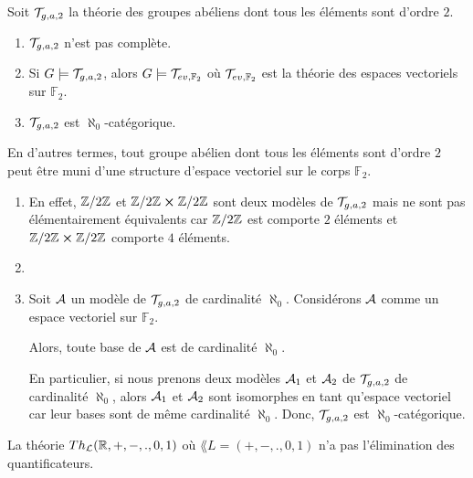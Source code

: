 \documentclass[a4paper, 12pt]{report}
\begin{document}
\begin{exercice}
	\label{exercice:groupe_abelien_elem_ordre_2_pas_complete}
	Soit $\mathcal{T}_{g, a, 2}$ la théorie des groupes abéliens dont tous les
	éléments sont d'ordre $2$.

	\begin{enumerate}
		\item $\mathcal{T}_{g, a, 2}$ n'est pas complète.
		\item Si $G \models \mathcal{T}_{g, a, 2}$, alors $G \models \mathcal{T}_{ev,
		\mathbb{F}_{2}}$ où $\mathcal{T}_{ev, \mathbb{F}_{2}}$ est la théorie des
		espaces vectoriels sur $\mathbb{F}_{2}$.
		\item $\mathcal{T}_{g, a, 2}$ est $\aleph_{0}$-catégorique.
	\end{enumerate}

	En d'autres termes, tout groupe abélien dont tous les éléments sont
	d'ordre $2$ peut être muni d'une structure d'espace vectoriel sur le corps
	$\mathbb{F}_{2}$.
\end{exercice}

\begin{answer}
	\begin{enumerate}
		\item En effet,
			$\mathbb{Z}/2\mathbb{Z}$ et $\mathbb{Z}/2\mathbb{Z} \cross
			\mathbb{Z}/2\mathbb{Z}$ sont deux modèles de $\mathcal{T}_{g, a, 2}$ mais
			ne sont pas élémentairement équivalents car $\mathbb{Z}/2\mathbb{Z}$ est
			comporte $2$ éléments et $\mathbb{Z}/2\mathbb{Z} \cross
			\mathbb{Z}/2\mathbb{Z}$ comporte $4$ éléments.
		\item
		\item Soit $\mathcal{A}$ un modèle de $\mathcal{T}_{g, a, 2}$ de
			cardinalité $\aleph_{0}$. Considérons $\mathcal{A}$ comme un espace vectoriel
			sur $\mathbb{F}_{2}$.

			Alors, toute base de $\mathcal{A}$ est de cardinalité $\aleph_{0}$.

			En particulier, si nous prenons deux modèles $\mathcal{A}_{1}$ et
			$\mathcal{A}_{2}$ de $\mathcal{T}_{g, a, 2}$ de cardinalité
			$\aleph_{0}$, alors $\mathcal{A}_{1}$ et $\mathcal{A}_{2}$ sont
			isomorphes en tant qu'espace vectoriel car leur bases sont de même
			cardinalité $\aleph_{0}$. Donc, $\mathcal{T}_{g, a, 2}$
			est $\aleph_{0}$-catégorique.
	\end{enumerate}
\end{answer}

\begin{exercice}
	\label{exercice:real_ring_not_elim_quantif}
	La théorie $Th_{\mathcal{L}}{(\mathbb{R}, +, -, ., 0, 1)}$ où $\lang{L} = (+, -, .,
	0, 1)$ n'a pas l'élimination des quantificateurs.
\end{exercice}
\end{document}
